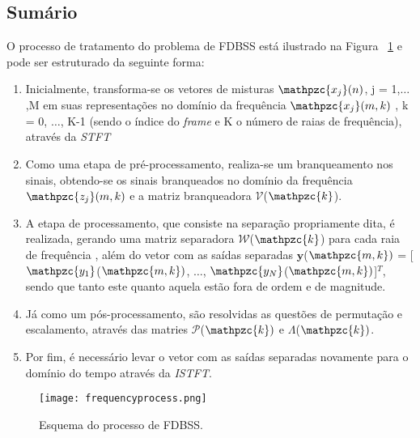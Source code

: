     \subsection{Sumário}
        O processo de tratamento do problema de FDBSS está ilustrado na Figura ~\ref{fig:frequencymodel} e pode ser estruturado da seguinte forma:
        
        \begin{enumerate}
            \item Inicialmente, transforma-se os vetores de misturas $\mathpzc{x_j}(n)$, j = 1,$\dots$,M em suas representações no domínio da frequência $\mathpzc{x_j}(m,k)$ , k = 0, $\dots$, K-1 (sendo  o índice do \textit{frame} e K o número de raias de frequência), através da \textit{STFT}
            
            \item Como uma etapa de pré-processamento, realiza-se um branqueamento nos sinais, obtendo-se os sinais branqueados no domínio da frequência  $\mathpzc{z_j}(m,k)$ e a matriz branqueadora $\mathcal{V}$($\mathpzc{k}$).
            
            \item A etapa de processamento, que consiste na separação propriamente dita, é realizada, gerando uma matriz separadora $\mathcal{W}$($\mathpzc{k}$) para cada raia de frequência , além do vetor com as saídas separadas $\mathbf{y}$($\mathpzc{m,k})$ = [$\mathpzc{y_1}$($\mathpzc{m,k})$, $\dots$, $\mathpzc{y_N}$($\mathpzc{m,k})$]$^T$, sendo que tanto este quanto aquela estão fora de ordem e de magnitude.
            
            \item Já como um pós-processamento, são resolvidas as questões de permutação e escalamento, através das matries $\mathcal{P}$($\mathpzc{k})$ e $\Lambda$($\mathpzc{k})$.
            
            \item Por fim, é necessário levar o vetor com as saídas separadas novamente para o domínio do tempo através da \textit{ISTFT}.
            
        \end{enumerate}

        \begin{figure}[h!]
            \texttt{[image: frequencyprocess.png]}
            \caption{Esquema do processo de FDBSS.}
            \label{fig:frequencymodel}
        \end{figure}

